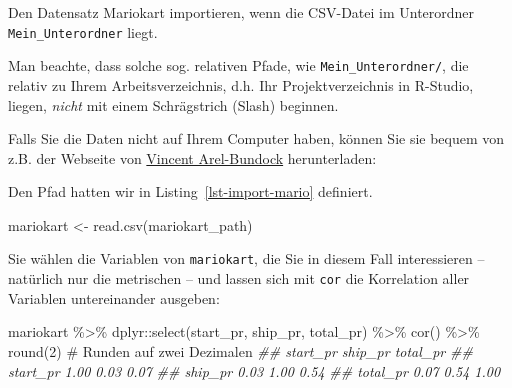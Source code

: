 \documentclass[
  letterpaper,
  twoside,
  open=any]{scrbook}
\newenvironment{Shaded}{\begin{snugshade}}{\end{snugshade}}
\newcommand{\CommentTok}[1]{\textcolor[rgb]{0.37,0.37,0.37}{#1}}
\newcommand{\DecValTok}[1]{\textcolor[rgb]{0.68,0.00,0.00}{#1}}
\newcommand{\DocumentationTok}[1]{\textcolor[rgb]{0.37,0.37,0.37}{\textit{#1}}}
\newcommand{\FunctionTok}[1]{\textcolor[rgb]{0.28,0.35,0.67}{#1}}
\newcommand{\NormalTok}[1]{\textcolor[rgb]{0.00,0.23,0.31}{#1}}
\newcommand{\OtherTok}[1]{\textcolor[rgb]{0.00,0.23,0.31}{#1}}
\newcommand{\SpecialCharTok}[1]{\textcolor[rgb]{0.37,0.37,0.37}{#1}}
\newcommand{\StringTok}[1]{\textcolor[rgb]{0.13,0.47,0.30}{#1}}
\theoremstyle{definition}
\theoremstyle{definition}
\theoremstyle{definition}
\theoremstyle{remark}
\begin{document}
\begin{codelisting}

\caption{\label{lst-mario-unterordner}Den Datensatz Mariokart
importieren, wenn die CSV-Datei im Unterordner
\texttt{Mein\_Unterordner} liegt.}

\centering{

\begin{Shaded}
\begin{Highlighting}[]
\NormalTok{mariokart }\OtherTok{\textless{}{-}} \FunctionTok{read.csv}\NormalTok{(}\StringTok{"Mein\_Unterordner/mariokart.csv"}\NormalTok{)}
\end{Highlighting}
\end{Shaded}

}

\end{codelisting}%

Man beachte, dass solche sog. relativen Pfade, wie
\texttt{Mein\_Unterordner/}, die relativ zu Ihrem Arbeitsverzeichnis,
d.h. Ihr Projektverzeichnis in R-Studio, liegen, \emph{nicht} mit einem
Schrägstrich (Slash) beginnen.

Falls Sie die Daten nicht auf Ihrem Computer haben, können Sie sie
bequem von z.B. der Webseite von
\href{https://vincentarelbundock.github.io/Rdatasets}{Vincent
Arel-Bundock} herunterladen:

Den Pfad hatten wir in Listing~\ref{lst-import-mario} definiert.

\begin{Shaded}
\begin{Highlighting}[]
\NormalTok{mariokart }\OtherTok{\textless{}{-}} \FunctionTok{read.csv}\NormalTok{(mariokart\_path)}
\end{Highlighting}
\end{Shaded}

Sie wählen die Variablen von \texttt{mariokart}, die Sie in diesem Fall
interessieren -- natürlich nur die metrischen -- und lassen sich mit
\texttt{cor} die Korrelation aller Variablen untereinander ausgeben:

\begin{Shaded}
\begin{Highlighting}[]
\NormalTok{mariokart }\SpecialCharTok{\%\textgreater{}\%}  
\NormalTok{  dplyr}\SpecialCharTok{::}\FunctionTok{select}\NormalTok{(start\_pr, ship\_pr, total\_pr) }\SpecialCharTok{\%\textgreater{}\%} 
  \FunctionTok{cor}\NormalTok{() }\SpecialCharTok{\%\textgreater{}\%} 
  \FunctionTok{round}\NormalTok{(}\DecValTok{2}\NormalTok{) }\CommentTok{\# Runden auf zwei Dezimalen}
\DocumentationTok{\#\#          start\_pr ship\_pr total\_pr}
\DocumentationTok{\#\# start\_pr     1.00    0.03     0.07}
\DocumentationTok{\#\# ship\_pr      0.03    1.00     0.54}
\DocumentationTok{\#\# total\_pr     0.07    0.54     1.00}
\end{Highlighting}
\end{Shaded}
\end{document}
